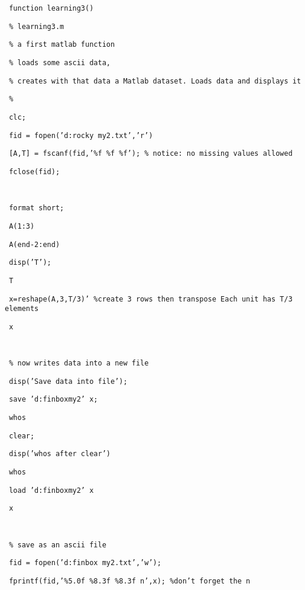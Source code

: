 \documentclass[12pt,a4paper]{article}
\begin{document}
\texttt{\ function learning3()}

\texttt{\ \% learning3.m}

\texttt{\ \% a first matlab function}

\texttt{\ \% loads some ascii data, }

\texttt{\ \% creates with that data a Matlab dataset. Loads data and
displays it}

\texttt{\ \%}

\texttt{\ clc;}

\texttt{\ fid = fopen('d:\TEXTsymbol{\backslash}\TEXTsymbol{\backslash}rocky%
\TEXTsymbol{\backslash}\TEXTsymbol{\backslash}my2.txt','r')}

\texttt{\ [A,T] = fscanf(fid,'\%f \%f \%f'); \% notice: no missing values
allowed}

\texttt{\ fclose(fid);}

\texttt{\ }

\texttt{\ format short;}

\texttt{\ A(1:3)}

\texttt{\ A(end-2:end)}

\texttt{\ disp('T');}

\texttt{\ T}

\texttt{\ x=reshape(A,3,T/3)' \%create 3 rows then transpose Each unit has
T/3 elements}

\texttt{\ x}

\texttt{\ }

\texttt{\ \% now writes data into a new file}

\texttt{\ disp('Save data into file');}

\texttt{\ save 'd:\TEXTsymbol{\backslash}finbox\TEXTsymbol{\backslash}my2' x;%
}

\texttt{\ whos}

\texttt{\ clear;}

\texttt{\ disp('whos after clear')}

\texttt{\ whos}

\texttt{\ load 'd:\TEXTsymbol{\backslash}finbox\TEXTsymbol{\backslash}my2' x}

\texttt{\ x}

\texttt{\ }

\texttt{\ \% save as an ascii file }

\texttt{\ fid = fopen('d:\TEXTsymbol{\backslash}\TEXTsymbol{\backslash}finbox%
\TEXTsymbol{\backslash}\TEXTsymbol{\backslash}my2.txt','w');}

\texttt{\ fprintf(fid,'\%5.0f \%8.3f \%8.3f \TEXTsymbol{\backslash}n',x);
\%don't forget the \TEXTsymbol{\backslash}n}
\end{document}
